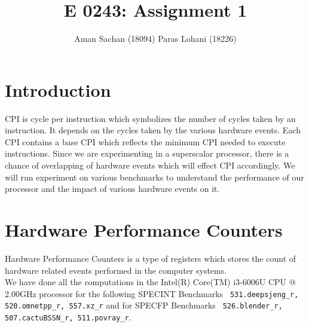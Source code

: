 \documentclass[10pt, letterpaper, IEEEtran, tikz,border=5,a4paper,fleqn]{article}
\begin{document}
\title{\vspace{-1 in}E 0243: Assignment 1}

\date{ \vspace{-0.5 in} Aman Sachan (18094) \hspace{30mm} Paras Lohani (18226)}

\maketitle


\section{Introduction}

CPI is cycle per instruction which symbolizes the number of cycles taken by an instruction. It depends on the cycles taken by the various hardware events. Each CPI contains a base CPI which reflects the minimum CPI needed to execute instructions. Since we are experimenting in a superscalar processor, there is a chance of overlapping of hardware events which will effect CPI accordingly. We will run experiment on various benchmarks to understand the performance of our processor and the impact of various hardware events on it.

\section{Hardware Performance Counters}
Hardware Performance Counters is a type of registers which stores the count of hardware related events performed in the computer systems.\\
We have done all the computations in the Intel(R) Core(TM) i3-6006U CPU @ 2.00GHz  processor for the following SPECINT Benchmarks \verb| 531.deepsjeng_r, 520.omnetpp_r, 557.xz_r| and for SPECFP Benchmarks \verb| 526.blender_r, 507.cactuBSSN_r, 511.povray_r|.
\end{document}
